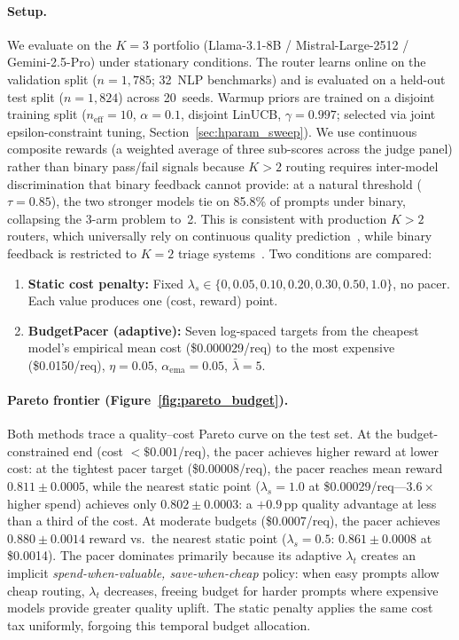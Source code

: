 \paragraph{Setup.}
We evaluate on the $K{=}3$ portfolio
(Llama-3.1-8B / Mistral-Large-2512 / Gemini-2.5-Pro)
under stationary conditions.
The router learns online on the validation split
($n{=}1{,}785$; 32~NLP benchmarks) and is evaluated on a held-out
test split ($n{=}1{,}824$) across 20~seeds.
Warmup priors are trained on a disjoint training split
($n_{\text{eff}}{=}10$, $\alpha{=}0.1$, disjoint LinUCB,
$\gamma{=}0.997$; selected via joint epsilon-constraint tuning,
Section~\ref{sec:hparam_sweep}).
We use continuous composite rewards (a weighted average of three
sub-scores across the judge panel) rather than binary pass/fail
signals because $K{>}2$ routing requires inter-model discrimination
that binary feedback cannot provide: at a natural threshold
($\tau{=}0.85$), the two stronger models tie on 85.8\% of prompts
under binary, collapsing the 3-arm problem to~2.
This is consistent with production $K{>}2$ routers, which
universally rely on continuous quality
prediction~\cite{wang2025mixllm,bhatti2026proteus}, while
binary feedback is restricted to $K{=}2$ triage
systems~\cite{ong2024routellm,wang2025barp}.
Two conditions are compared:
\begin{enumerate}[nosep,leftmargin=*]
  \item \textbf{Static cost penalty:}
    Fixed $\lambda_s \in \{0, 0.05, 0.10, 0.20, 0.30, 0.50, 1.0\}$,
    no pacer.  Each value produces one (cost, reward) point.
  \item \textbf{BudgetPacer (adaptive):}
    Seven log-spaced targets from the cheapest model's empirical mean
    cost (\$0.000029/req) to the most expensive (\$0.0150/req),
    $\eta{=}0.05$, $\alpha_{\mathrm{ema}}{=}0.05$, $\bar\lambda{=}5$.
\end{enumerate}

\paragraph{Pareto frontier (Figure~\ref{fig:pareto_budget}).}
Both methods trace a quality--cost Pareto curve on the test set.
At the budget-constrained end (cost $< \$0.001$/req), the pacer
achieves higher reward at lower cost:
at the tightest pacer target (\$0.00008/req), the pacer
reaches mean reward $0.811 \pm 0.0005$, while the nearest static
point ($\lambda_s{=}1.0$ at \$0.00029/req---$3.6\times$ higher
spend) achieves only $0.802 \pm 0.0003$: a $+0.9$\,pp quality
advantage at less than a third of the cost.
At moderate budgets (\$0.0007/req), the pacer achieves
$0.880 \pm 0.0014$ reward vs.\ the nearest static point
($\lambda_s{=}0.5$: $0.861 \pm 0.0008$ at \$0.0014).
The pacer dominates primarily because its adaptive $\lambda_t$
creates an implicit \emph{spend-when-valuable, save-when-cheap} policy:
when easy prompts allow cheap routing, $\lambda_t$ decreases,
freeing budget for harder prompts where expensive models provide
greater quality uplift.
The static penalty applies the same cost tax uniformly, forgoing
this temporal budget allocation.

